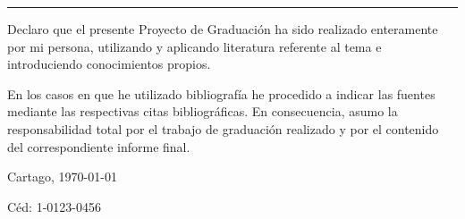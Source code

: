 \thispagestyle{empty}

\rule{10mm}{0pt}

\vfill

Declaro que el presente Proyecto de Graduación ha sido realizado enteramente
por mi persona, utilizando y aplicando literatura referente al tema e
introduciendo conocimientos propios.

En los casos en que he utilizado bibliografía he procedido a indicar las
fuentes mediante las respectivas citas bibliográficas.  En consecuencia,
asumo la responsabilidad total por el trabajo de graduación realizado y por
el contenido del correspondiente informe final.

\vspace*{8mm}

\begin{flushright}
  \scriptAuthor\par
  Cartago, \today\par
  Céd: 1-0123-0456
\end{flushright}

\cleardoublepage

